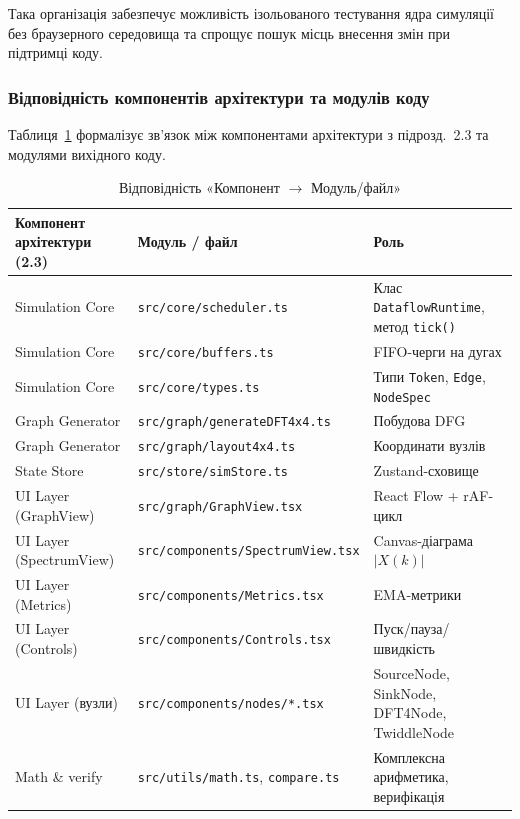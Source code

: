 Така організація забезпечує можливість ізольованого тестування ядра
симуляції без браузерного середовища та спрощує пошук місць
внесення змін при підтримці коду.

\subsubsection*{Відповідність компонентів архітектури та модулів коду}

Таблиця~\ref{tab:arch_to_code} формалізує зв'язок між компонентами
архітектури з підрозд.~2.3 та модулями вихідного коду.

\begin{table}[H]
  \caption{Відповідність «Компонент $\to$ Модуль/файл»}
  \label{tab:arch_to_code}
  \centering
  \small
  \begin{tabular}{p{3.5cm}p{5.5cm}p{4.2cm}}
    \toprule
    Компонент архітектури (2.3) & Модуль / файл & Роль \\
    \midrule
    Simulation Core & \texttt{src/core/scheduler.ts} & Клас \texttt{DataflowRuntime}, метод \texttt{tick()} \\
    Simulation Core & \texttt{src/core/buffers.ts} & FIFO-черги на дугах \\
    Simulation Core & \texttt{src/core/types.ts} & Типи \texttt{Token}, \texttt{Edge}, \texttt{NodeSpec} \\
    Graph Generator & \texttt{src/graph/generateDFT4x4.ts} & Побудова DFG \\
    Graph Generator & \texttt{src/graph/layout4x4.ts} & Координати вузлів \\
    State Store & \texttt{src/store/simStore.ts} & Zustand-сховище \\
    UI Layer (GraphView) & \texttt{src/graph/GraphView.tsx} & React Flow + rAF-цикл \\
    UI Layer (SpectrumView) & \texttt{src/components/SpectrumView.tsx} & Canvas-діаграма $|X(k)|$ \\
    UI Layer (Metrics) & \texttt{src/components/Metrics.tsx} & EMA-метрики \\
    UI Layer (Controls) & \texttt{src/components/Controls.tsx} & Пуск/пауза/швидкість \\
    UI Layer (вузли) & \texttt{src/components/nodes/*.tsx} & SourceNode, SinkNode, DFT4Node, TwiddleNode \\
    Math \& verify & \texttt{src/utils/math.ts}, \texttt{compare.ts} & Комплексна арифметика, верифікація \\
    \bottomrule
  \end{tabular}
\end{table}

